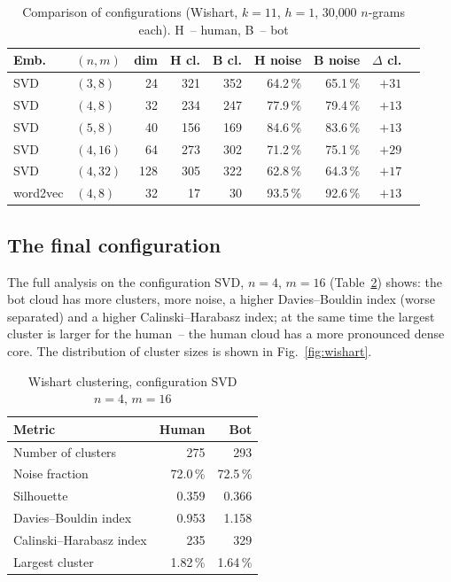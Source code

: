 \documentclass[12pt,a4paper]{article}
\begin{document}
\begin{table}[ht]
\centering
\caption{Comparison of configurations (Wishart, $k=11$, $h=1$, 30{,}000
$n$-grams each). H~-- human, B~-- bot}
\label{tab:configs}
\small
\begin{tabular}{llrr rr rr r}
\toprule
Emb. & $(n,m)$ & dim & H cl. & B cl. & H noise & B noise & $\Delta$ cl. \\
\midrule
SVD  & $(3,8)$  & 24  & 321 & 352 & 64.2\,\% & 65.1\,\% & $+31$ \\
SVD  & $(4,8)$  & 32  & 234 & 247 & 77.9\,\% & 79.4\,\% & $+13$ \\
SVD  & $(5,8)$  & 40  & 156 & 169 & 84.6\,\% & 83.6\,\% & $+13$ \\
SVD  & $(4,16)$ & 64  & 273 & 302 & 71.2\,\% & 75.1\,\% & $+29$ \\
SVD  & $(4,32)$ & 128 & 305 & 322 & 62.8\,\% & 64.3\,\% & $+17$ \\
word2vec & $(4,8)$ & 32 & 17 & 30 & 93.5\,\% & 92.6\,\% & $+13$ \\
\bottomrule
\end{tabular}
\end{table}

\subsection{The final configuration}

The full analysis on the configuration SVD, $n=4$, $m=16$
(Table~\ref{tab:final}) shows: the bot cloud has more clusters, more noise, a
higher Davies--Bouldin index (worse separated) and a higher Calinski--Harabasz
index; at the same time the largest cluster is larger for the human~-- the human
cloud has a more pronounced dense core. The distribution of cluster sizes is
shown in Fig.~\ref{fig:wishart}.

\begin{table}[ht]
\centering
\caption{Wishart clustering, configuration SVD $n{=}4,\,m{=}16$}
\label{tab:final}
\begin{tabular}{lrr}
\toprule
Metric & Human & Bot \\
\midrule
Number of clusters     & 275   & 293 \\
Noise fraction         & 72.0\,\% & 72.5\,\% \\
Silhouette             & 0.359 & 0.366 \\
Davies--Bouldin index  & 0.953 & 1.158 \\
Calinski--Harabasz index & 235 & 329 \\
Largest cluster        & 1.82\,\% & 1.64\,\% \\
\bottomrule
\end{tabular}
\end{table}
\end{document}
